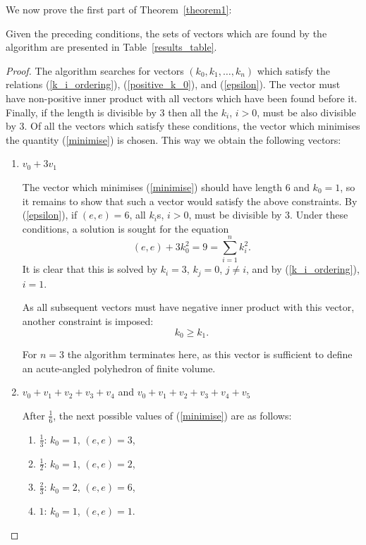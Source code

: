 \documentclass[smallcondensed]{svjour3}                     %
\begin{document}
We now prove the first part of Theorem~\ref{theorem1}:
\begin{proposition}\label{vector_prop}
Given the preceding conditions, the sets of vectors which are found by the algorithm are presented in Table~\ref{results_table}.
\end{proposition}
\begin{proof}
The algorithm searches for vectors $(k_0, k_1, \ldots, k_n)$ which satisfy the relations (\ref{k_i_ordering}), (\ref{positive_k_0}), and (\ref{epsilon}). The vector must have non-positive inner product with all vectors which have been found before it. Finally, if the length is divisible by $3$ then all the $k_i$, $i > 0$, must be also divisible by $3$. Of all the vectors which satisfy these conditions, the vector which minimises the quantity (\ref{minimise}) is chosen. This way we obtain the following vectors:

\begin{enumerate}
\item $v_0 + 3 v_1$

The vector which minimises (\ref{minimise}) should have length $6$ and $k_0 = 1$, so it remains to show that such a vector would satisfy the above constraints. By (\ref{epsilon}), if $(e, e) = 6$, all $k_i$s, $i > 0$, must be divisible by $3$. Under these conditions, a solution is sought for the equation
\[(e, e) + 3 k_0^2 = 9 = \sum_{i=1}^n k_i^2.\]
It is clear that this is solved by $k_i = 3$, $k_j = 0$, $j \neq i$, and by (\ref{k_i_ordering}), $i = 1$.

As all subsequent vectors must have negative inner product with this vector, another constraint is imposed:
\begin{equation}\label{k_0_ordering}
k_0 \ge k_1.
\end{equation}

For $n=3$ the algorithm terminates here, as this vector is sufficient to define an acute-angled polyhedron of finite volume.

\item $v_0 + v_1 + v_2 + v_3 + v_4$ and $v_0 + v_1 + v_2 + v_3 + v_4 + v_5$

After $\frac{1}{6}$, the next possible values of (\ref{minimise}) are as follows:
\begin{enumerate}
\item $\frac{1}{3}$: $k_0 = 1$, $(e, e) = 3$, 
\item $\frac{1}{2}$: $k_0 = 1$, $(e, e) = 2$, 
\item $\frac{2}{3}$: $k_0 = 2$, $(e, e) = 6$, 
\item $1$: $k_0 = 1$, $(e, e) = 1$.
\end{enumerate}


\end{enumerate}
\end{proof}
\end{document}
